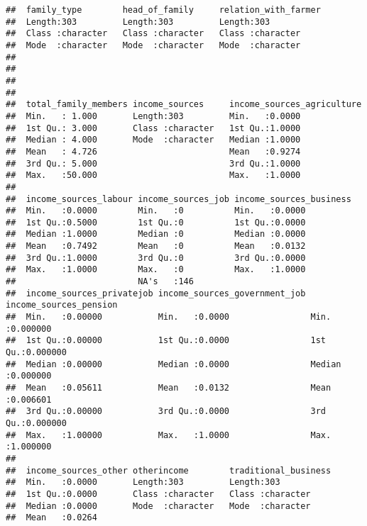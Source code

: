 \documentclass[
]{article}
\begin{document}
\begin{verbatim}
##  family_type        head_of_family     relation_with_farmer
##  Length:303         Length:303         Length:303          
##  Class :character   Class :character   Class :character    
##  Mode  :character   Mode  :character   Mode  :character    
##                                                            
##                                                            
##                                                            
##                                                            
##  total_family_members income_sources     income_sources_agriculture
##  Min.   : 1.000       Length:303         Min.   :0.0000            
##  1st Qu.: 3.000       Class :character   1st Qu.:1.0000            
##  Median : 4.000       Mode  :character   Median :1.0000            
##  Mean   : 4.726                          Mean   :0.9274            
##  3rd Qu.: 5.000                          3rd Qu.:1.0000            
##  Max.   :50.000                          Max.   :1.0000            
##                                                                    
##  income_sources_labour income_sources_job income_sources_business
##  Min.   :0.0000        Min.   :0          Min.   :0.0000         
##  1st Qu.:0.5000        1st Qu.:0          1st Qu.:0.0000         
##  Median :1.0000        Median :0          Median :0.0000         
##  Mean   :0.7492        Mean   :0          Mean   :0.0132         
##  3rd Qu.:1.0000        3rd Qu.:0          3rd Qu.:0.0000         
##  Max.   :1.0000        Max.   :0          Max.   :1.0000         
##                        NA's   :146                               
##  income_sources_privatejob income_sources_government_job income_sources_pension
##  Min.   :0.00000           Min.   :0.0000                Min.   :0.000000      
##  1st Qu.:0.00000           1st Qu.:0.0000                1st Qu.:0.000000      
##  Median :0.00000           Median :0.0000                Median :0.000000      
##  Mean   :0.05611           Mean   :0.0132                Mean   :0.006601      
##  3rd Qu.:0.00000           3rd Qu.:0.0000                3rd Qu.:0.000000      
##  Max.   :1.00000           Max.   :1.0000                Max.   :1.000000      
##                                                                                
##  income_sources_other otherincome        traditional_business
##  Min.   :0.0000       Length:303         Length:303          
##  1st Qu.:0.0000       Class :character   Class :character    
##  Median :0.0000       Mode  :character   Mode  :character    
##  Mean   :0.0264                                              

\end{verbatim}
\end{document}
